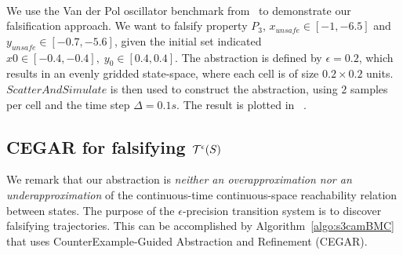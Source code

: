 \begin{example}~\label{ex:vdp}



We use the Van der Pol oscillator benchmark
from~\cite{zutshi2014multiple} to demonstrate our falsification
approach. We want to falsify property $P_3$, $x_{unsafe}\in[-1,
-6.5]$ and $y_{unsafe}\in[-0.7, -5.6]$, given the initial set
indicated $x0\in[-0.4, -0.4],\; y_0\in[0.4, 0.4]$. The abstraction
is defined by $\epsilon=0.2$, which results in an evenly gridded
state-space, where each cell is of size $0.2 \times 0.2$ units.
$ScatterAndSimulate$ is then used to construct the abstraction,
using $2$ samples per cell and the time step $\Delta = 0.1s$. The
result is plotted in ~.

\end{example}

\subsection{CEGAR for falsifying $\mathcal{T}^{\epsilon}(S)$}

We remark that our abstraction is {\em neither an overapproximation
nor an underapproximation} of the continuous-time continuous-space
reachability relation between states. The purpose of the
$\epsilon$-precision transition system is to discover falsifying
trajectories. This can be accomplished by
Algorithm~\ref{algo:s3camBMC} that uses CounterExample-Guided
Abstraction and Refinement (CEGAR).

